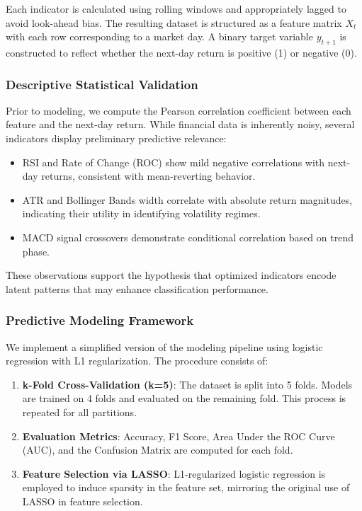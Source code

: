 Each indicator is calculated using rolling windows and appropriately lagged to avoid look-ahead bias. The resulting dataset is structured as a feature matrix $X_t$ with each row corresponding to a market day. A binary target variable $y_{t+1}$ is constructed to reflect whether the next-day return is positive (1) or negative (0).

\subsubsection{Descriptive Statistical Validation}

Prior to modeling, we compute the Pearson correlation coefficient between each feature and the next-day return. While financial data is inherently noisy, several indicators display preliminary predictive relevance:

\begin{itemize}
  \item RSI and Rate of Change (ROC) show mild negative correlations with next-day returns, consistent with mean-reverting behavior.
  \item ATR and Bollinger Bands width correlate with absolute return magnitudes, indicating their utility in identifying volatility regimes.
  \item MACD signal crossovers demonstrate conditional correlation based on trend phase.
\end{itemize}

These observations support the hypothesis that optimized indicators encode latent patterns that may enhance classification performance.

\subsubsection{Predictive Modeling Framework}

We implement a simplified version of the modeling pipeline using logistic regression with L1 regularization. The procedure consists of:

\begin{enumerate}
  \item \textbf{k-Fold Cross-Validation (k=5)}: The dataset is split into 5 folds. Models are trained on 4 folds and evaluated on the remaining fold. This process is repeated for all partitions.
  \item \textbf{Evaluation Metrics}: Accuracy, F1 Score, Area Under the ROC Curve (AUC), and the Confusion Matrix are computed for each fold.
  \item \textbf{Feature Selection via LASSO}: L1-regularized logistic regression is employed to induce sparsity in the feature set, mirroring the original use of LASSO in feature selection.
\end{enumerate}

